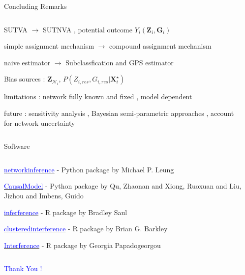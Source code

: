 \documentclass[notes,11pt, aspectratio=169]{beamer}
\begin{document}
\begin{frame}{Concluding Remarks}
\begin{columns}[T] %
\begin{column}{\textwidth}
  \begin{wideitemize}
  \item  SUTVA $\longrightarrow$ SUTNVA , potential outcome $Y_i(\mathbf{Z}_i,\mathbf{G}_i)$
  \item simple assignment mechanism $\longrightarrow$ compound assignment mechanism 
  \item naive estimator $\longrightarrow$ Subclassfication and GPS estimator
  \item Bias sources : $\mathbf{Z}_{\mathcal{N}_i}$, $P(Z_{i,res},G_{i,res}|\mathbf{X}_i^{\star})$
  \item limitations : network fully known and fixed , model dependent 
  \item future : sensitivity analysis , Bayesian semi-parametric approaches , account for network uncertainty

  \end{wideitemize}
\end{column}%
\hfill%
\begin{column}{.38\textwidth}
  \vspace{20pt}
  \vspace{20pt}
\end{column}%
\end{columns}
\end{frame}



\begin{frame}{Software}
\begin{columns}[T] %
\begin{column}{.8\textwidth}
  \begin{wideitemize}
      \item \href{https://nbviewer.org/github/mpleung/networkinference/blob/main/docs/tutorial/tutorial.ipynb}{\textcolor{blue}{networkinference}} - Python package by Michael P. Leung 
      \item \href{https://github.com/freshtaste/CausalModel}{\textcolor{blue}{CausalModel}} - Python package by Qu, Zhaonan and Xiong, Ruoxuan and Liu, Jizhou and Imbens, Guido 
      \item \href{https://cran.r-project.org/web/packages/inferference/index.html}{\textcolor{blue}{inferference}} - R package by Bradley Saul
      \item \href{https://cran.r-project.org/web/packages/clusteredinterference/index.html}{\textcolor{blue}{clusteredinterference}} - R package by Brian G. Barkley 
      \item \href{https://github.com/gpapadog/Interference}{\textcolor{blue}{Interference}} - R package by Georgia Papadogeorgou
  \end{wideitemize}
\end{column}
\end{columns}
\end{frame}


\begin{frame}
  \begin{center}
    { \Huge \textcolor{blue}{Thank You !}}
  \end{center}
\end{frame}
\end{document}

